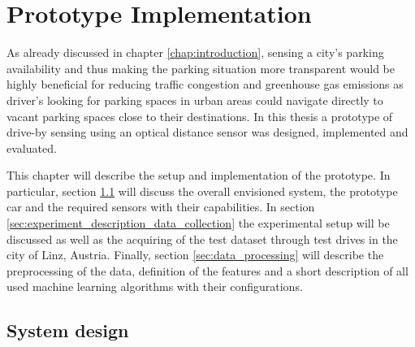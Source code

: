 \chapter{Prototype Implementation}
\label{chap:referenceimplementation}

As already discussed in chapter \ref{chap:introduction}, sensing a city's parking availability and thus making the parking situation more transparent would be highly beneficial for reducing traffic congestion and greenhouse gas emissions as driver's looking for parking spaces in urban areas could navigate directly to vacant parking spaces close to their destinations. In this thesis a prototype of drive-by sensing using an optical distance sensor was designed, implemented and evaluated.

This chapter will describe the setup and implementation of the prototype. In particular, section \ref{sec:system_design} will discuss the overall envisioned system, the prototype car and the required sensors with their capabilities. In section \ref{sec:experiment_description_data_collection} the experimental setup will be discussed as well as the acquiring of the test dataset through test drives in the city of Linz, Austria. Finally, section \ref{sec:data_processing} will describe the preprocessing of the data, definition of the features and a short description of all used machine learning algorithms with their configurations. 




\section{System design}
\label{sec:system_design}



